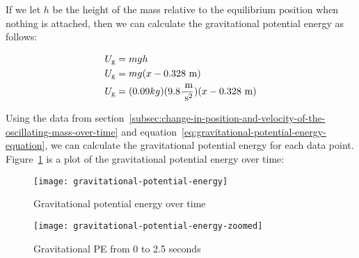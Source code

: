 \documentclass[titlepage]{article}
\begin{document}
                If we let $h$ be the height of the mass relative to the equilibrium position when nothing is attached, then we can calculate the gravitational potential energy as follows:
                
                \begin{equation}
                    \begin{aligned}
                        \small
                        U_{\text{g}} &= mgh \\
                        U_{\text{g}} &= mg(x - 0.328 \text{ m}) \\
                        U_{\text{g}} &= (0.09 kg)(9.8 \frac{\text{ m}}{\text{ s}^2})(x - 0.328 \text{ m}) \\
                    \end{aligned}\label{eq:gravitational-potential-energy-equation}
                \end{equation}
                
                Using the data from section~\ref{subsec:change-in-position-and-velocity-of-the-oscillating-mass-over-time} and equation~\ref{eq:gravitational-potential-energy-equation}, we can calculate the gravitational potential energy for each data point.
                Figure~\ref{fig:gravitational-potential-energy} is a plot of the gravitational potential energy over time:
                
                \begin{minipage}{.5\textwidth}
                    \begin{figure}[H]
                        \centering
                        \texttt{[image: gravitational-potential-energy]}
                        \caption{Gravitational potential energy over time}
                        \label{fig:gravitational-potential-energy}
                    \end{figure}
                \end{minipage}%
                \begin{minipage}{.5\textwidth}
                    \begin{figure}[H]
                        \centering
                        \texttt{[image: gravitational-potential-energy-zoomed]}
                        \caption{Gravitational PE from 0 to 2.5 seconds}
                        \label{fig:gravitational-potential-energy-zoomed}
                    \end{figure}
                \end{minipage}\\
                
\end{document}
